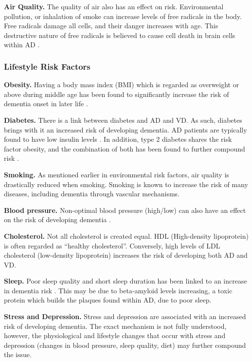 \textbf{Air Quality.}
The quality of air also has an effect on risk. Environmental pollution, or inhalation of smoke can increase levels of free radicals in the body. Free radicals damage all cells, and their danger increases with age. This destructive nature of free radicals is believed to cause cell death in brain cells within AD \cite{AlzheimerEurope2015}.

\subsubsection{Lifestyle Risk Factors}

\textbf{Obesity.}
Having a body mass index (BMI) which is regarded as overweight or above during middle age has been found to significantly increase the risk of dementia onset in later life \cite{Profenno2010}.

\textbf{Diabetes.}
There is a link between diabetes and AD and VD. As such, diabetes brings with it an increased risk of developing dementia. AD patients are typically found to have low insulin levels \cite{Dosunmu2007}. In addition, type 2 diabetes shares the risk factor obesity, and the combination of both has been found to further compound risk \cite{Profenno2010}.

\textbf{Smoking.} As mentioned earlier in environmental risk factors, air quality is drastically reduced when smoking. Smoking is known to increase the risk of many diseases, including dementia through vascular mechanisms.

\textbf{Blood pressure.}
Non-optimal blood pressure (high/low) can also have an effect on the risk of developing dementia \cite{Qiu2005}.

\textbf{Cholesterol.}
Not all cholesterol is created equal. HDL (High-density lipoprotein) is often regarded as ``healthy cholesterol''. Conversely, high levels of LDL cholesterol (low-density lipoprotein) increases the risk of developing both AD and VD.

\textbf{Sleep.}
Poor sleep quality and short sleep duration has been linked to an increase in dementia risk \cite{Tsapanou2015}. This may be due to beta-amyloid levels increasing, a toxic protein which builds the plaques found within AD, due to poor sleep.

\textbf{Stress and Depression.}
Stress and depression are associated with an increased risk of developing dementia\cite{Saczynski2010}. The exact mechanism is not fully understood, however, the physiological and lifestyle changes that occur with stress and depression (changes in blood pressure, sleep quality, diet) may further compound the issue\cite{Schneiderman2005, Tsapanou2015}.

